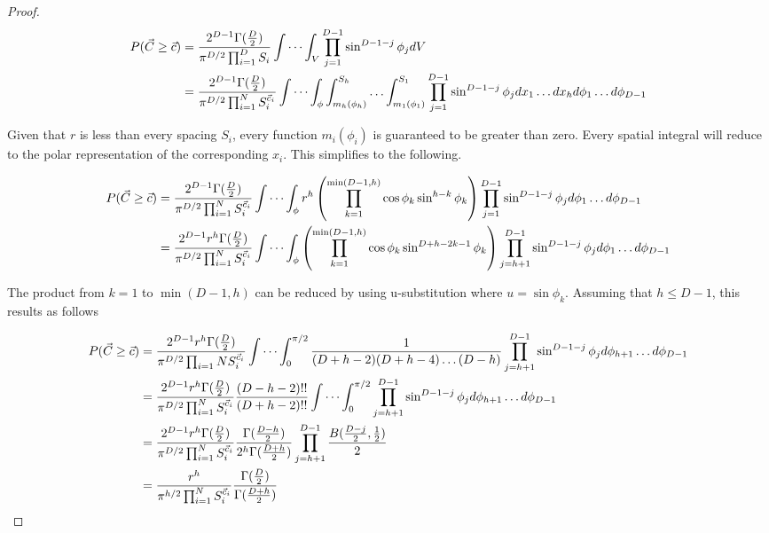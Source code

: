 \documentclass{article}
\begin{document}
\begin{proof}
	\begin{align}
		P(\vec{C}\ge \vec{c}) &= \frac{2^{D-1}\Gamma(\frac{D}{2})}{\pi^{D/2}\prod_{i=1}^D S_i} \idotsint_V \prod_{j=1}^{D-1}\sin^{D-1-j}\phi_j dV \\
		&= \frac{2^{D-1}\Gamma(\frac{D}{2})}{\pi^{D/2}\prod_{i=1}^N S_i^{\vec{c}_i}} \idotsint_{\phi}  \int_{m_h(\phi_h)}^{S_h} \hdots \int_{m_1(\phi_1)}^{S_1} \prod_{j=1}^{D-1}\sin^{D-1-j}\phi_j dx_1\hdots dx_h d\phi_1 \hdots d\phi_{D-1}
	\end{align}

	Given that $r$ is less than every spacing $S_i$, every function $m_i(\phi_i)$ is guaranteed
	to be greater than zero. Every spatial integral will reduce to the polar representation of
	the corresponding $x_i$. This simplifies to the following.

	\begin{align}
		P(\vec{C}\ge \vec{c}) &= \frac{2^{D-1}\Gamma(\frac{D}{2})}{\pi^{D/2}\prod_{i=1}^N S_i^{\vec{c}_i}} \idotsint_\phi r^h \left( \prod_{k=1}^{\min(D-1, h)} \cos\phi_k\sin^{h-k}\phi_k\right) \prod_{j=1}^{D-1}\sin^{D-1-j}\phi_j d\phi_1 \hdots d\phi_{D-1} \\
		&= \frac{2^{D-1}r^h\Gamma(\frac{D}{2})}{\pi^{D/2}\prod_{i=1}^N S_i^{\vec{c}_i}} \idotsint_\phi \left( \prod_{k=1}^{\min(D-1, h)} \cos\phi_k\sin^{D+h-2k-1}\phi_k\right) \prod_{j=h+1}^{D-1}\sin^{D-1-j}\phi_j d\phi_1 \hdots d\phi_{D-1}
	\end{align}

	The product from $k=1$ to $\min(D-1,h)$ can be reduced by using u-substitution where 
	$u=\sin\phi_k$. Assuming that $h\le D-1$, this results as follows

	\begin{align}
		P(\vec{C}\ge \vec{c}) &= \frac{2^{D-1}r^h\Gamma(\frac{D}{2})}{\pi^{D/2}\prod_{i=1}N S_i^{\vec{c}_i}} \idotsint_0^{\pi/2} \frac{1}{(D+h-2)(D+h-4)\hdots(D-h)} \prod_{j=h+1}^{D-1}\sin^{D-1-j}\phi_j d\phi_{h+1} \hdots d\phi_{D-1} \\
		&= \frac{2^{D-1}r^h\Gamma(\frac{D}{2})}{\pi^{D/2}\prod_{i=1}^N S_i^{\vec{c}_i}} \frac{(D-h-2)!!}{(D+h-2)!!} \idotsint_0^{\pi/2} \prod_{j=h+1}^{D-1}\sin^{D-1-j}\phi_j d\phi_{h+1} \hdots d\phi_{D-1} \\
		&= \frac{2^{D-1}r^h\Gamma(\frac{D}{2})}{\pi^{D/2}\prod_{i=1}^N S_i^{\vec{c}_i}} \frac{\Gamma(\frac{D-h}{2})}{2^h \Gamma(\frac{D+h}{2})} \prod_{j=h+1}^{D-1}\frac{B(\frac{D-j}{2}, \frac{1}{2})}{2} \\
		&= \frac{r^{h}}{\pi^{h/2}\prod_{i=1}^N S_i^{\vec{c}_i}} \frac{\Gamma(\frac{D}{2})}{\Gamma(\frac{D+h}{2})} \\
	\end{align}


\end{proof}
\end{document}
